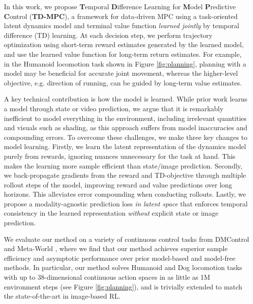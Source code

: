 \documentclass{article}
\begin{document}
In this work, we propose \textbf{T}emporal \textbf{D}ifference Learning for \textbf{M}odel \textbf{P}redictive \textbf{C}ontrol (\textbf{TD-MPC}), a framework for data-driven MPC using a task-oriented latent dynamics model and terminal value function \emph{learned jointly} by temporal difference (TD) learning. At each decision step, we perform trajectory optimization using short-term reward estimates generated by the learned model, and use the learned value function for long-term return estimates. For example, in the Humanoid locomotion task shown in Figure \ref{fig:planning}, planning with a model may be beneficial for accurate joint movement, whereas the higher-level objective, e.g. direction of running, can be guided by long-term value estimates.

A key technical contribution is how the model is learned. While prior work learns a model through state or video prediction, we argue that it is remarkably inefficient to model everything in the environment, including irrelevant quantities and visuals such as shading, as this approach suffers from model inaccuracies and compounding errors. To overcome these challenges, we make three key changes to model learning. Firstly, we learn the latent representation of the dynamics model purely from rewards, ignoring nuances unnecessary for the task at hand. This makes the learning more sample efficient than state/image prediction. Secondly, we back-propagate gradients from the reward and TD-objective through multiple rollout steps of the model, improving reward and value predictions over long horizons. This alleviates error compounding when conducting rollouts. Lastly, we propose a modality-agnostic prediction loss \emph{in latent space} that enforces temporal consistency in the learned representation \emph{without} explicit state or image prediction.

We evaluate our method on a variety of continuous control tasks from DMControl \citep{deepmindcontrolsuite2018} and Meta-World \citep{yu2019meta}, where we find that our method achieves superior sample efficiency and asymptotic performance over prior model-based and model-free methods. In particular, our method solves Humanoid and Dog locomotion tasks with up to 38-dimensional continuous action spaces in as little as 1M environment steps (see Figure \ref{fig:planning}), and is trivially extended to match the state-of-the-art in image-based RL.
\end{document}
